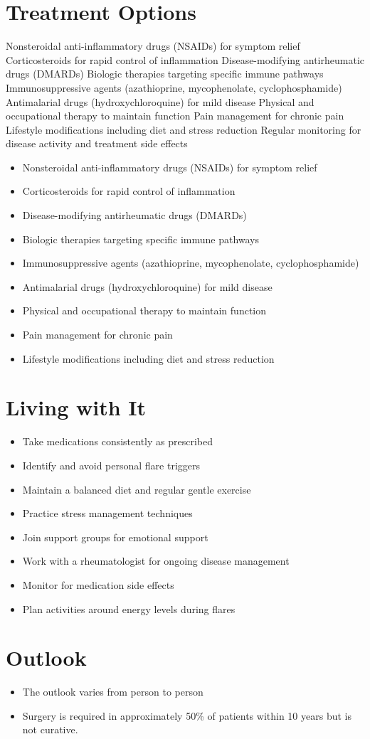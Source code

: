 \section{Treatment Options}
Nonsteroidal anti-inflammatory drugs (NSAIDs) for symptom relief Corticosteroids for rapid control of inflammation Disease-modifying antirheumatic drugs (DMARDs) Biologic therapies targeting specific immune pathways Immunosuppressive agents (azathioprine, mycophenolate, cyclophosphamide) Antimalarial drugs (hydroxychloroquine) for mild disease Physical and occupational therapy to maintain function Pain management for chronic pain Lifestyle modifications including diet and stress reduction Regular monitoring for disease activity and treatment side effects

\begin{itemize}[noitemsep]
  \item Nonsteroidal anti-inflammatory drugs (NSAIDs) for symptom relief
  \item Corticosteroids for rapid control of inflammation
  \item Disease-modifying antirheumatic drugs (DMARDs)
  \item Biologic therapies targeting specific immune pathways
  \item Immunosuppressive agents (azathioprine, mycophenolate, cyclophosphamide)
  \item Antimalarial drugs (hydroxychloroquine) for mild disease
  \item Physical and occupational therapy to maintain function
  \item Pain management for chronic pain
  \item Lifestyle modifications including diet and stress reduction
\end{itemize}
\section{Living with It}
\begin{itemize}[noitemsep]
  \item Take medications consistently as prescribed
  \item Identify and avoid personal flare triggers
  \item Maintain a balanced diet and regular gentle exercise
  \item Practice stress management techniques
  \item Join support groups for emotional support
  \item Work with a rheumatologist for ongoing disease management
  \item Monitor for medication side effects
  \item Plan activities around energy levels during flares
\end{itemize}
\section{Outlook}
\begin{itemize}[noitemsep]
  \item The outlook varies from person to person
  \item Surgery is required in approximately 50\% of patients within 10 years but is not curative.
\end{itemize}
